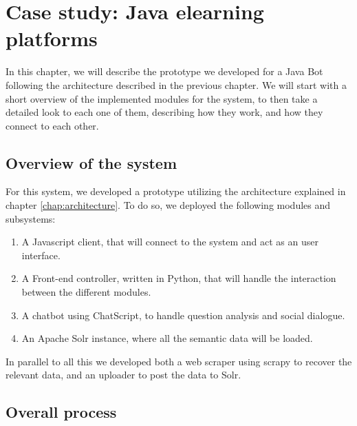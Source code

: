 \chapter{Case study: Java elearning platforms}
\label{chap:usecasejava}

\begin{chapterintro}

In this chapter, we will describe the prototype we developed for a Java Bot following the architecture described in the previous chapter. We will start with a short overview of the implemented modules for the system, to then take a detailed look to each one of them, describing how they work, and how they connect to each other.
 
\end{chapterintro}

\cleardoublepage

\section{Overview of the system}

For this system, we developed a prototype utilizing the architecture explained in chapter \ref{chap:architecture}. To do so, we deployed the following modules and subsystems:

\begin{enumerate}
 \item A Javascript client, that will connect to the system and act as an user interface.
 \item A Front-end controller, written in Python, that will handle the interaction between the different modules.
 \item A chatbot using ChatScript, to handle question analysis and social dialogue.
 \item An Apache Solr instance, where all the semantic data will be loaded.
\end{enumerate}

In parallel to all this we developed both a web scraper using scrapy to recover the relevant data, and an uploader to post the data to Solr.


\section{Overall process}

